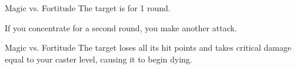 \begin{comment}
\spellsection{Vestments of the Mage}{2}
\begin{spellheader}
    \spelldesc{You imbue a set of armor with magical power, preventing it from interfering with your spellcasting.}
    \spelltwocol{\spelltgt{One nonmagical armor or shield}}{\spellrng{Touch}}
\end{spellheader}
\begin{spelleffects}
    \spelldur{\durext \dismissable}
    \spelleffect The armor or shield's chance of arcane spell failure decreases by 10\% as long as you are wearing or using it. If any other creature wears the armor, it receives no benefit from this spell.
\end{spelleffects}
\begin{spellfooter}
    \spellinfo{Transmutation (Imbuement)}{Arcane}
    \spellnotes This decrease is considered an enhancement enhancement bonus.
\end{spellfooter}%
\end{comment}

\begin{spellheader}
\end{spellheader}
\begin{spelleffects}
    \begin{spellattack}{Magic vs. Fortitude}
        \spellsuccess The target is \staggered for 1 round.
    \end{spellattack}
    \spellspecial If you concentrate for a second round, you make another attack.
    \begin{spellattack}{Magic vs. Fortitude}
        \spellsuccess The target loses all its hit points and takes critical damage equal to your caster level, causing it to begin dying.
    \end{spellattack}
\end{spelleffects}
\begin{spellfooter}

\end{spellfooter}


